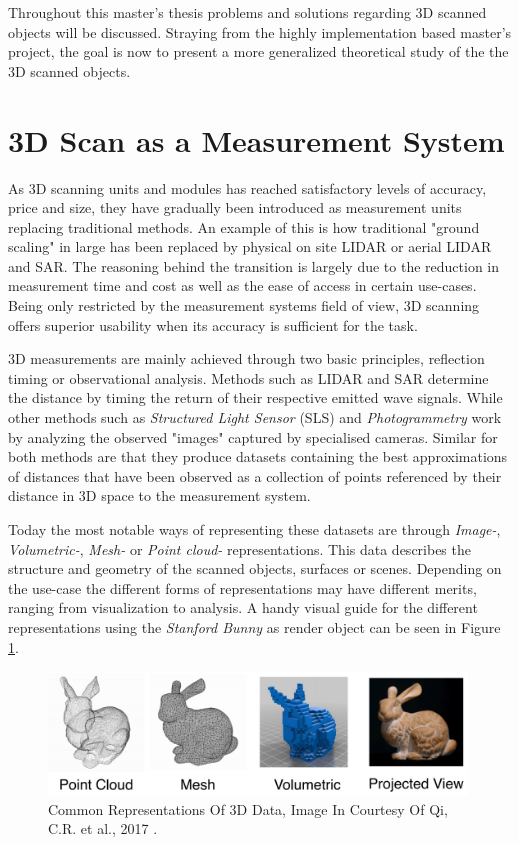 \documentclass[%
]{USN-MSc}
\begin{document}
Throughout this master's thesis problems and solutions regarding 3D scanned objects will be discussed. Straying from the highly implementation based master's project, the goal is now to present a more generalized theoretical study of the the 3D scanned objects.


\section{3D Scan as a Measurement System}
\label{sc:3d scan}
As 3D scanning units and modules has reached satisfactory levels of accuracy, price and size, they have gradually been introduced as measurement units replacing traditional methods. An example of this is how traditional "ground scaling" in large has been replaced by physical on site LIDAR or aerial LIDAR and SAR. The reasoning behind the transition is largely due to the reduction in measurement time and cost as well as the ease of access in certain use-cases. Being only restricted by the measurement systems field of view, 3D scanning offers superior usability when its accuracy is sufficient for the task.

3D measurements are mainly achieved through two basic principles, reflection timing or observational analysis. Methods such as LIDAR and SAR determine the distance by timing the return of their respective emitted wave signals. While other methods such as \textit{Structured Light Sensor} (SLS) and \textit{Photogrammetry} work by analyzing the observed "images" captured by specialised cameras. Similar for both methods are that they produce datasets containing the best approximations of distances that have been observed as a collection of points referenced by their distance in 3D space to the measurement system.

Today the most notable ways of representing these datasets are through \textit{Image-}, \textit{Volumetric-}, \textit{Mesh-} or \textit{Point cloud-} representations. This data describes the structure and geometry of the scanned objects, surfaces or scenes. Depending on the use-case the different forms of representations may have different merits, ranging from visualization to analysis. A handy visual guide for the different representations using the \textit{Stanford Bunny} \cite{Stanford-bunny} as render object can be seen in Figure \ref{fig:Common Representations of 3D data}.

\begin{figure}[H]
    \centering
    \includegraphics[width=0.99\textwidth]{fig/Stanford Bunny Point net.png}
    \caption{Common Representations Of 3D Data, Image In Courtesy Of Qi, C.R. et al., 2017 \cite{Point-net-presentation}.}
    \label{fig:Common Representations of 3D data}
\end{figure}
\clearpage
\end{document}

